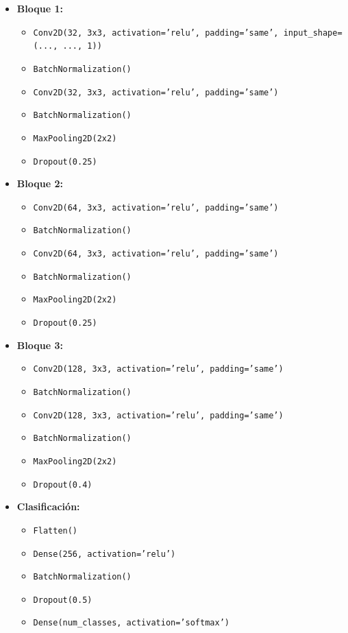 \documentclass[11pt,spanish,listoffigures,listoftables]{tfgetsinf}
\begin{document}
\begin{itemize}
    \item \textbf{Bloque 1:}
    \begin{itemize}
        \item \texttt{Conv2D(32, 3x3, activation='relu', padding='same', input\_shape=(..., ..., 1))}
        \item \texttt{BatchNormalization()}
        \item \texttt{Conv2D(32, 3x3, activation='relu', padding='same')}
        \item \texttt{BatchNormalization()}
        \item \texttt{MaxPooling2D(2x2)}
        \item \texttt{Dropout(0.25)}
    \end{itemize}
    \item \textbf{Bloque 2:}
    \begin{itemize}
        \item \texttt{Conv2D(64, 3x3, activation='relu', padding='same')}
        \item \texttt{BatchNormalization()}
        \item \texttt{Conv2D(64, 3x3, activation='relu', padding='same')}
        \item \texttt{BatchNormalization()}
        \item \texttt{MaxPooling2D(2x2)}
        \item \texttt{Dropout(0.25)}
    \end{itemize}
    \item \textbf{Bloque 3:}
    \begin{itemize}
        \item \texttt{Conv2D(128, 3x3, activation='relu', padding='same')}
        \item \texttt{BatchNormalization()}
        \item \texttt{Conv2D(128, 3x3, activation='relu', padding='same')}
        \item \texttt{BatchNormalization()}
        \item \texttt{MaxPooling2D(2x2)}
        \item \texttt{Dropout(0.4)}
    \end{itemize}
    \item \textbf{Clasificación:}
    \begin{itemize}
        \item \texttt{Flatten()}
        \item \texttt{Dense(256, activation='relu')}
        \item \texttt{BatchNormalization()}
        \item \texttt{Dropout(0.5)}
        \item \texttt{Dense(num\_classes, activation='softmax')}
    \end{itemize}
\end{itemize}
\end{document}
